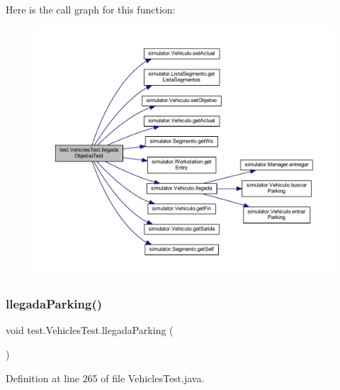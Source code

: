 Here is the call graph for this function\+:\nopagebreak
\begin{figure}[H]
\begin{center}
\leavevmode
\includegraphics[width=350pt]{classtest_1_1_vehicles_test_a34624265089253eb5d45a7fcffeacd90_cgraph}
\end{center}
\end{figure}
\mbox{\label{classtest_1_1_vehicles_test_a9b90c693ab518856b021096cefde1e73}} 
\subsubsection{\texorpdfstring{llegada\+Parking()}{llegadaParking()}}
{\footnotesize\ttfamily void test.\+Vehicles\+Test.\+llegada\+Parking (\begin{DoxyParamCaption}{ }\end{DoxyParamCaption})}



Definition at line 265 of file Vehicles\+Test.\+java.

